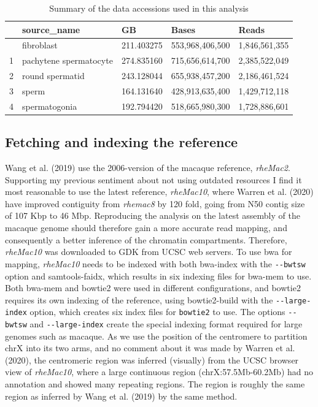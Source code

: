 \documentclass[
  11pt,
  a4paper,
]{scrbook}
\begin{document}
\begin{longtable}[]{@{}lllll@{}}

\caption{\label{tbl-runtable-summary}Summary of the data accessions used
in this analysis}

\tabularnewline

\toprule\noalign{}
& source\_name & GB & Bases & Reads \\
\midrule\noalign{}
\endhead
\bottomrule\noalign{}
\endlastfoot
0 & fibroblast & 211.403275 & 553,968,406,500 & 1,846,561,355 \\
1 & pachytene spermatocyte & 274.835160 & 715,656,614,700 &
2,385,522,049 \\
2 & round spermatid & 243.128044 & 655,938,457,200 & 2,186,461,524 \\
3 & sperm & 164.131640 & 428,913,635,400 & 1,429,712,118 \\
4 & spermatogonia & 192.794420 & 518,665,980,300 & 1,728,886,601 \\

\end{longtable}

\subsection{Fetching and indexing the
reference}\label{fetching-and-indexing-the-reference}

Wang et al. (2019) use the 2006-version of the macaque reference,
\emph{rheMac2}. Supporting my previous sentiment about not using
outdated resources I find it most reasonable to use the latest
reference, \emph{rheMac10}, where Warren et al. (2020) have improved
contiguity from \emph{rhemac8} by 120 fold, going from N50 contig size
of 107 Kbp to 46 Mbp. Reproducing the analysis on the latest assembly of
the macaque genome should therefore gain a more accurate read mapping,
and consequently a better inference of the chromatin compartments.
Therefore, \emph{rheMac10} was downloaded to GDK from UCSC web servers.
To use bwa for mapping, \emph{rheMac10} needs to be indexed with both
bwa-index with the \texttt{-\/-bwtsw} option and samtools-faidx, which
results in six indexing files for bwa-mem to use. Both bwa-mem and
bowtie2 were used in different configurations, and bowtie2 requires its
own indexing of the reference, using bowtie2-build with the
\texttt{-\/-large-index} option, which creates six index files for
\texttt{bowtie2} to use. The options \texttt{-\/-bwtsw} and
\texttt{-\/-large-index} create the special indexing format required for
large genomes such as macaque. As we use the position of the centromere
to partition chrX into its two arms, and no comment about it was made by
Warren et al. (2020), the centromeric region was inferred (visually)
from the UCSC browser view of \emph{rheMac10}, where a large continuous
region (chrX:57.5Mb-60.2Mb) had no annotation and showed many repeating
regions. The region is roughly the same region as inferred by Wang et
al. (2019) by the same method.
\end{document}
